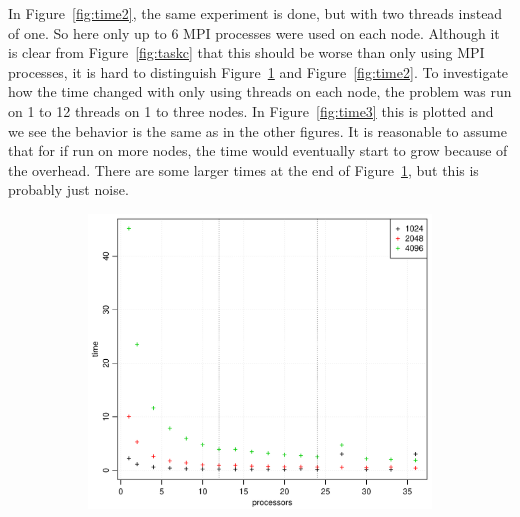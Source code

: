 In Figure~\ref{fig:time2}, the same experiment is done, but with two threads instead of one. So here only up to 6 MPI processes were used on each node. Although it is clear from Figure~\ref{fig:taskc} that this should be worse than only using MPI processes, it is hard to distinguish Figure~\ref{fig:time1} and Figure~\ref{fig:time2}. To investigate how the time changed with only using threads on each node, the problem was run on 1 to 12 threads on 1 to three nodes. In Figure~\ref{fig:time3} this is plotted and we see the behavior is the same as in the other figures. It is reasonable to assume that for if run on more nodes, the time would eventually start to grow because of the overhead. There are some larger times at the end of Figure~\ref{fig:time1}, but this is probably just noise.\\
%
\begin{figure}[h!]
  \centering
  \begin{subfigure}[b]{0.48\textwidth}
    \includegraphics[width=\textwidth]{./Figures/taskbTimeProc1.pdf}
    \caption{}
    \label{fig:time1}
  \end{subfigure}%
  \quad
  \begin{subfigure}[b]{0.48\textwidth}

\end{subfigure}
\end{figure}
